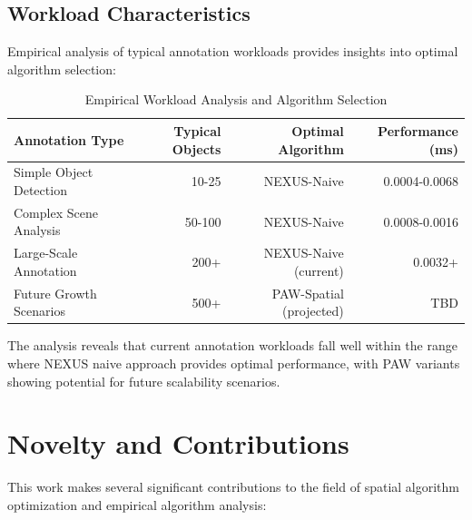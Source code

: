 \documentclass[10pt]{article}
\begin{document}
\subsection{Workload Characteristics}

Empirical analysis of typical annotation workloads provides insights into optimal algorithm selection:

\begin{table}[H]
\caption{Empirical Workload Analysis and Algorithm Selection}
\label{tab:production_analysis}
\begin{center}
\begin{tabular}{@{}lrrr@{}}
\toprule
\textbf{Annotation Type} & \textbf{Typical Objects} & \textbf{Optimal Algorithm} & \textbf{Performance (ms)} \\
\midrule
Simple Object Detection & 10-25 & NEXUS-Naive & 0.0004-0.0068 \\
Complex Scene Analysis & 50-100 & NEXUS-Naive & 0.0008-0.0016 \\
Large-Scale Annotation & 200+ & NEXUS-Naive (current) & 0.0032+ \\
Future Growth Scenarios & 500+ & PAW-Spatial (projected) & TBD \\
\bottomrule
\end{tabular}
\end{center}
\end{table}

The analysis reveals that current annotation workloads fall well within the range where NEXUS naive approach provides optimal performance, with PAW variants showing potential for future scalability scenarios.

\section{Novelty and Contributions}

This work makes several significant contributions to the field of spatial algorithm optimization and empirical algorithm analysis:
\end{document}
